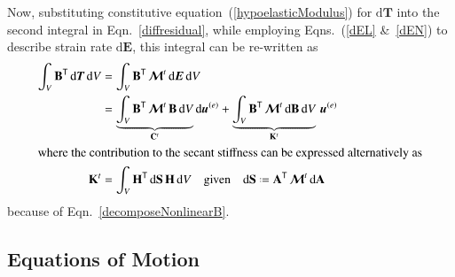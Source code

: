 Now, substituting constitutive equation~(\ref{hypoelasticModulus}) for $\mathrm{d} \boldsymbol{T}$ into the second integral in Eqn.~\eqref{diffresidual}, while employing Eqns.~(\ref{dEL} \&\ \ref{dEN}) to describe strain rate $\mathrm{d}\boldsymbol{E}$, this integral can be re-written as 
\begin{subequations}
    \label{tangentStiffness}
    \begin{align}
    \int_V \mathbf{B}^{\mathsf{T}} \, \mathrm{d} \boldsymbol{T} \, \mathrm{d}V & = 
    \int_V \mathbf{B}^{\mathsf{T}} \, \boldsymbol{\mathcal{M}}^t \, \mathrm{d} \boldsymbol{E} \, \mathrm{d}V \\ 
    \mbox{} & = \underbrace{\int_V \mathbf{B}^{\mathsf{T}} \, \boldsymbol{\mathcal{M}}^t \, 
    \mathbf{B} \, \mathrm{d}V}_{\mathbf{C}^t} \mathrm{d}\boldsymbol{u}^{(e)} + 
    \underbrace{\int_V \mathbf{B}^{\mathsf{T}} \, \boldsymbol{\mathcal{M}}^t \, \mathrm{d}
    \mathbf{B} \, \mathrm{d} V}_{\mathbf{K}^t} \, \boldsymbol{u}^{(e)} \\
    \intertext{where the contribution to the secant stiffness can be expressed alternatively as}
    \mathbf{K}^t & = \int_V \mathbf{H}^{\mathsf{T}} \, \mathrm{d} \mathbf{S} \, 
    \mathbf{H} \, \mathrm{d} V 
    \quad \text{given} \quad
    \mathrm{d} \mathbf{S} \defeq \mathbf{A}^{\mathsf{T}} \, 
    \boldsymbol{\mathcal{M}}^t \, \mathrm{d} \mathbf{A}
    \end{align}
\end{subequations}
because of Eqn.~\eqref{decomposeNonlinearB}.


\subsection{Equations of Motion}

